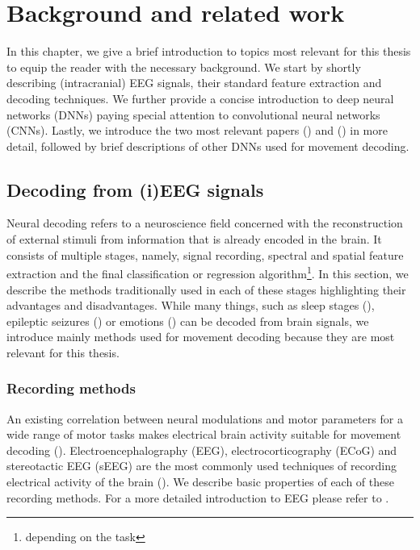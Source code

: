 \chapter{Background and related work}
\label{chap:background}
In this chapter, we give a brief introduction to topics most relevant for this thesis to equip the reader with the necessary background.
We start by shortly describing (intracranial) EEG signals, their standard feature extraction and decoding techniques. We further provide a concise introduction to deep neural networks (DNNs) paying special attention to convolutional neural networks (CNNs).
Lastly, we introduce the two most relevant papers (\cite{Hammer-2021}) and (\cite{schirrmeister-deep-2017}) in more detail, followed by brief descriptions of other DNNs used for movement decoding.

\section{Decoding from (i)EEG signals}
Neural decoding refers to a neuroscience field concerned with the reconstruction of external stimuli from information that is already encoded in the brain.
It consists of multiple stages, namely, signal recording, spectral and spatial feature extraction and the final classification or regression algorithm\footnote{depending on the task}. 
In this section, we describe the methods traditionally used in each of these stages highlighting their advantages and disadvantages. 
While many things, such as sleep stages (\cite{sleep-eegnet}), epileptic seizures (\cite{epileptic-seizures-eeg}) or emotions (\cite{emotion-eeg}) can be decoded from brain signals, we introduce mainly methods used for movement decoding because they are most relevant for this thesis. 

\subsection{Recording methods}
An existing correlation between neural modulations and motor parameters for a wide range of motor tasks makes electrical brain activity suitable for movement decoding  (\cite{lebedev-cortical-2005}).
Electroencephalography (EEG), electrocorticography (ECoG) and stereotactic EEG (sEEG) are the most commonly used techniques of recording electrical activity of the brain (\cite{tam-human-2019}).
We describe basic properties of each of these recording methods. For a more detailed introduction to EEG please refer to \cite{NiedermeyersElectroencephalography}.

